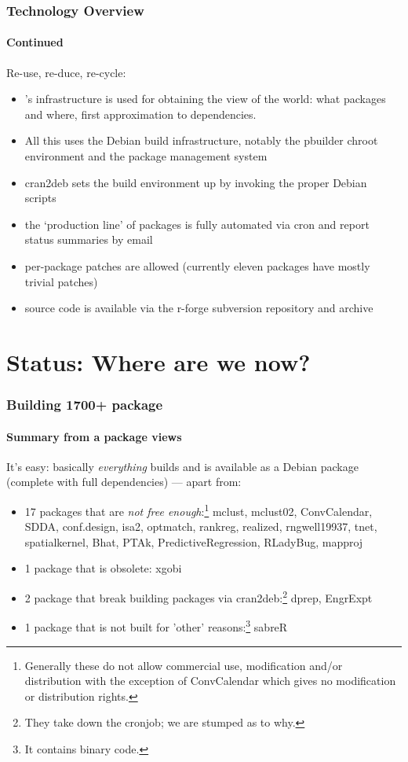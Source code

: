 \documentclass[smaller,compress]{beamer}
\begin{document}
\begin{frame}
  \frametitle{Technology Overview} 
  \framesubtitle{Continued}

  Re-use, re-duce, re-cycle:

  \begin{itemize}
  \item \R's infrastructure is used for obtaining the \R view of the world:
    what packages and where, first approximation to dependencies.
  \item All this uses the Debian build infrastructure, notably the
    pbuilder chroot environment and the package management system
  \item cran2deb sets the build environment up by invoking the proper Debian
    scripts 
  \item the `production line' of packages is fully automated via cron and report status
    summaries by email
  \item per-package patches are allowed (currently eleven packages have
    mostly trivial patches)
  \item source code is available via the r-forge subversion repository and archive
  \end{itemize}

\end{frame}

\section[Status]{Status: Where are we now?}

\begin{frame}
  \frametitle{Building 1700+ package}
  \framesubtitle{Summary from a package views}

  It's easy: basically \textsl{everything} builds and is available as a
  Debian package (complete with full dependencies) --- apart from:

  \begin{itemize}
  \item 17 packages that are \textsl{not free enough}:\footnote{Generally these
do not allow commercial use, modification and/or distribution with the
exception of ConvCalendar which gives no modification or distribution rights.}
    mclust, mclust02, ConvCalendar, SDDA, conf.design, isa2, optmatch,
    rankreg, realized, rngwell19937, tnet, spatialkernel, Bhat, PTAk,
    PredictiveRegression, RLadyBug, mapproj 
  \item 1 package that is obsolete: xgobi
  \item 2 package that break building packages via cran2deb:\footnote{They
      take down the cronjob; we are stumped as to why.} dprep, EngrExpt
  \item 1 package that is not built for 'other' reasons:\footnote{It contains
      binary code.} sabreR
  \end{itemize}
\end{frame}
\end{document}

